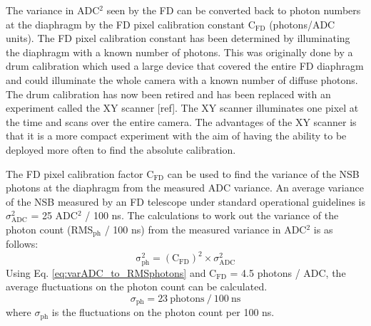 The variance in ADC$^2$ seen by the FD can be converted back to photon numbers at the diaphragm by the FD pixel calibration constant C$_{\mathrm{FD}}$ (photons/ADC units). The FD pixel calibration constant has been determined by illuminating the diaphragm with a known number of photons. This was originally done by a drum calibration which used a large device that covered the entire FD diaphragm and could illuminate the whole camera with a known number of diffuse photons. The drum calibration has now been retired and has been replaced with an experiment called the XY scanner [ref]. The XY scanner illuminates one pixel at the time and scans over the entire camera. The advantages of the XY scanner is that it is a more compact experiment with the aim of having the ability to be deployed more often to find the absolute calibration.

The FD pixel calibration factor C$_{\mathrm{FD}}$ can be used to find the variance of the NSB photons at the diaphragm from the measured ADC variance. An average variance of the NSB measured by an FD telescope under standard operational guidelines is $\sigma^2_{\mathrm{ADC}}$ = 25 ADC$^2$ / 100 ns. The calculations to work out the variance of the photon count (RMS$_{\mathrm{ph}}$ / 100 ns) from the measured variance in ADC$^2$ is as follows:
\begin{equation}
\mathrm{\sigma}^2_{\mathrm{ph}} = (\mathrm{C}_{\mathrm{FD}})^2 \times \sigma^2_{\mathrm{ADC}} \label{eq:varADC_to_RMSphotons}
\end{equation}
Using Eq. \ref{eq:varADC_to_RMSphotons} and C$_{\mathrm{FD}}$ = 4.5 photons / ADC, the average fluctuations on the photon count can be calculated.
\begin{equation}
\sigma_{\mathrm{ph}} = 23 \ \mathrm{photons} \ / \ 100 \ \mathrm{ns} \nonumber
\end{equation}
where $\sigma_{\mathrm{ph}}$ is the fluctuations on the photon count per 100 ns.

